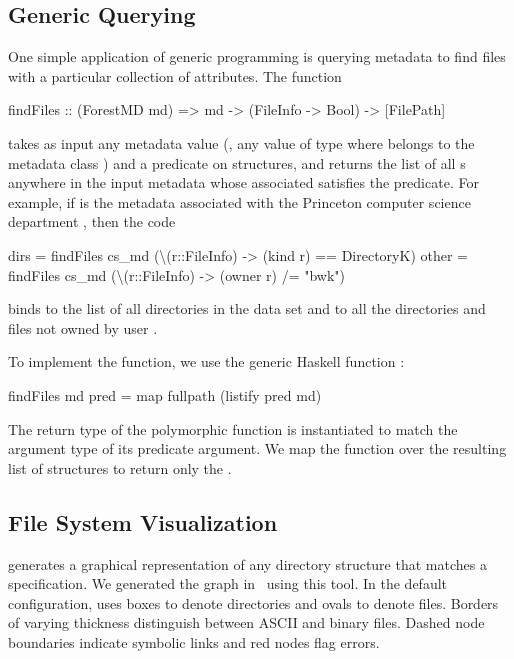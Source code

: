 \subsection{Generic Querying }
One simple application of generic programming is querying 
metadata to find files with a particular collection of attributes. 
The  function 
\begin{code}
findFiles :: (ForestMD md) => 
     md -> (FileInfo -> Bool) -> [FilePath]
\end{code}
takes as input any \forest{} metadata value (\ie{}, any
value of type  where  belongs to the \forest{}
metadata class ) and a predicate on 
structures, and returns the list of all s anywhere in the
input metadata whose associated  satisfies the
predicate.  For example, if  is the metadata associated
with the Princeton computer science department \filestore{}, then the code 
\begin{code}
dirs  = findFiles cs_md (\textbackslash(r::FileInfo) -> 
                           (kind r) == DirectoryK)
other = findFiles cs_md (\textbackslash(r::FileInfo) -> 
                           (owner r) /= "bwk")
\end{code}
binds  to the list of all directories in the data set and
 to all the directories and files not owned by 
user .

To implement the  function, we use the generic Haskell
function : 
\begin{code}
findFiles md pred = map fullpath (listify pred md)
\end{code}
The return type of the polymorphic  function is
instantiated to match the argument type of its predicate argument. 
We map the  function over the resulting list of
 structures to return only the .

\subsection{File System Visualization}
\fg{} generates a graphical representation of any directory structure
that matches a \forest{} specification.  We generated the graph in~ using  
this tool.  In the default configuration, \fg{} uses boxes to denote
directories and ovals to denote files. Borders of varying
thickness distinguish between ASCII and binary files.  
Dashed node boundaries indicate symbolic links and red nodes flag errors.

